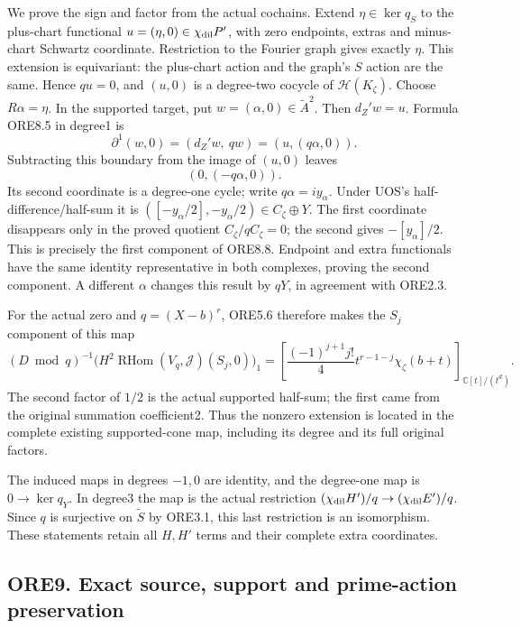 We prove the sign and factor from the actual cochains. Extend
\(\eta\in\ker q_S\) to the plus-chart functional
\(u=(\eta,0)\in\chi_{\rm dil}P'\), with zero endpoints, extras and
minus-chart Schwartz coordinate. Restriction to the Fourier graph gives
exactly \(\eta\). This extension is equivariant: the plus-chart action
and the graph's \(S\) action are the same. Hence \(q u=0\), and
\((u,0)\) is a degree-two cocycle of \(\mathscr H(K_\zeta)\). Choose
\(R\alpha=\eta\). In the supported target, put
\(w=(\alpha,0)\in\widetilde A^2\). Then \(d_Z'w=u\). Formula ORE8.5 in
degree1 is \[
\partial^1(w,0)=(d_Z'w,\ q w)=(u,(q\alpha,0)).
\] Subtracting this boundary from the image of \((u,0)\) leaves \[
(0,(-q\alpha,0)).
\tag{ORE8.9}
\] Its second coordinate is a degree-one cycle; write
\(q\alpha=i y_\alpha\). Under UOS's half-difference/half-sum it is
\(([-y_\alpha/2],-y_\alpha/2)\in C_\zeta\oplus Y\). The first coordinate
disappears only in the proved quotient \(C_\zeta/qC_\zeta=0\); the
second gives \(-[y_\alpha]/2\). This is precisely the first component of
ORE8.8. Endpoint and extra functionals have the same identity
representative in both complexes, proving the second component. A
different \(\alpha\) changes this result by \(qY\), in agreement with
ORE2.3.

For the actual zero and \(q=(X-b)^r\), ORE5.6 therefore makes the
\(S_j\) component of this map \[
\boxed{
(D\bmod q)^{-1}
\bigl(H^2\operatorname{RHom}(V_q,\mathcal J)(S_j,0)\bigr)_1
=
\left[\frac{(-1)^{j+1}j!}{4}
t^{r-1-j}\chi_\zeta(b+t)\right]_{\mathbb C[t]/(t^d)}.}
\tag{ORE8.10}
\] The second factor of \(1/2\) is the actual supported half-sum; the
first came from the original summation coefficient2. Thus the nonzero
extension is located in the complete existing supported-cone map,
including its degree and its full original factors.

The induced maps in degrees \(-1,0\) are identity, and the degree-one
map is \(0\to\ker q_Y\). In degree3 the map is the actual restriction
\((\chi_{\rm dil}H')/q\to(\chi_{\rm dil}E')/q\). Since \(q\) is
surjective on \(\widetilde S\) by ORE3.1, this last restriction is an
isomorphism. These statements retain all \(H,H'\) terms and their
complete extra coordinates.

\subsection{ORE9. Exact source, support and prime-action
preservation}\label{ore9.-exact-source-support-and-prime-action-preservation}

